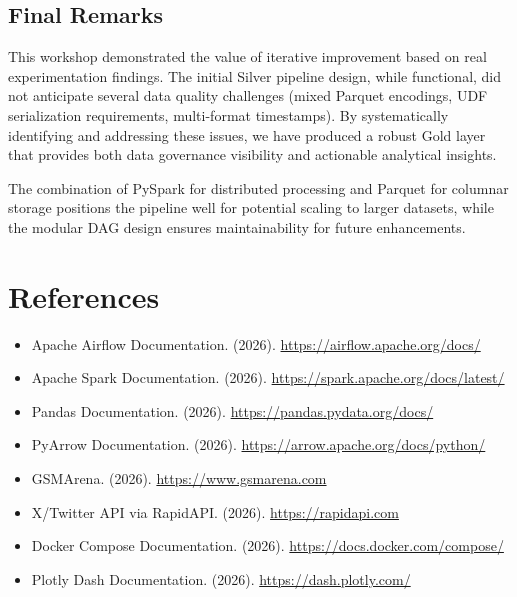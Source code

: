 \documentclass[12pt]{article}
\begin{document}
\subsection{Final Remarks}

This workshop demonstrated the value of iterative improvement based on real experimentation findings. The initial Silver pipeline design, while functional, did not anticipate several data quality challenges (mixed Parquet encodings, UDF serialization requirements, multi-format timestamps). By systematically identifying and addressing these issues, we have produced a robust Gold layer that provides both data governance visibility and actionable analytical insights.

The combination of PySpark for distributed processing and Parquet for columnar storage positions the pipeline well for potential scaling to larger datasets, while the modular DAG design ensures maintainability for future enhancements.

\newpage

\section{References}
\label{sec:references}

\begin{itemize}
    \item Apache Airflow Documentation. (2026). \url{https://airflow.apache.org/docs/}
    
    \item Apache Spark Documentation. (2026). \url{https://spark.apache.org/docs/latest/}
    
    \item Pandas Documentation. (2026). \url{https://pandas.pydata.org/docs/}
    
    \item PyArrow Documentation. (2026). \url{https://arrow.apache.org/docs/python/}
    
    \item GSMArena. (2026). \url{https://www.gsmarena.com}
    
    \item X/Twitter API via RapidAPI. (2026). \url{https://rapidapi.com}
    
    \item Docker Compose Documentation. (2026). \url{https://docs.docker.com/compose/}
    
    \item Plotly Dash Documentation. (2026). \url{https://dash.plotly.com/}
\end{itemize}
\end{document}
